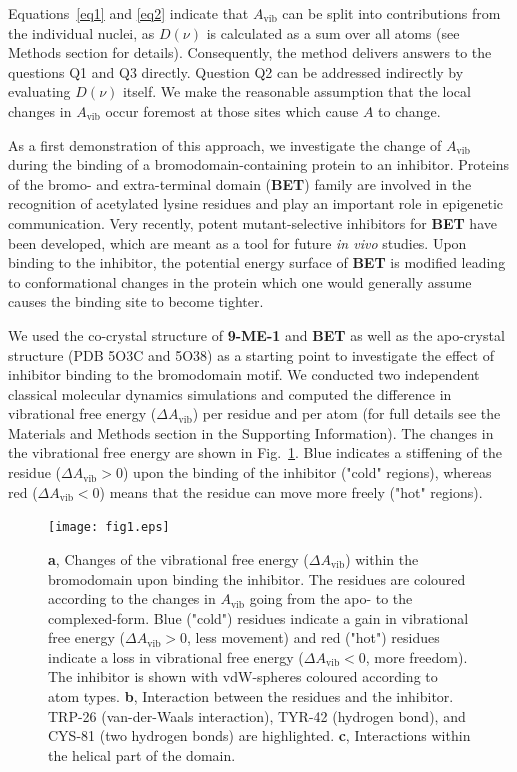\documentclass[journal=jpclcd,manuscript=article]{achemso}
\newcommand{\bet}{\textbf{BET}}
\newcommand{\avib}{A_\mathrm{vib}}
\begin{document}
Equations~\ref{eq1} and \ref{eq2} indicate that $\avib{}$ can be split into contributions from the individual nuclei, as $D(\nu)$ is calculated as a sum over all atoms (see Methods section for details). Consequently, the method delivers answers to the questions Q1 and Q3 directly. Question Q2 can be addressed indirectly by evaluating $D(\nu)$ itself. We make the reasonable assumption that the local changes in $\avib{}$ occur foremost at those sites which cause $A$ to change.

As a first demonstration of this approach, we investigate the change of $\avib{}$ during the binding of a bromodomain-containing protein to an inhibitor. Proteins of the bromo- and extra-terminal domain (\bet{}) family are involved in the recognition of acetylated lysine residues and play an important role in epigenetic communication\cite{Filippakopoulos2012}. Very recently, potent mutant-selective inhibitors for \bet{} have been developed\cite{Runcie2018}, which are meant as a tool for future \textit{in vivo} studies. Upon binding to the inhibitor, the potential energy surface of \bet{} is modified leading to conformational changes in the protein which one would generally assume causes the binding site to become tighter.

We used the co-crystal structure of \textbf{9-ME-1} and \bet{} as well as the apo-crystal structure (PDB 5O3C and 5O38\cite{Runcie2018}) as a starting point to investigate the effect of inhibitor binding to the bromodomain motif. We conducted two independent classical molecular dynamics simulations and computed the difference in vibrational free energy ($\Delta \avib{}$) per residue and per atom (for full details see the Materials and Methods section in the Supporting Information). The changes in the vibrational free energy are shown in Fig.~\ref{fig:bromo}. Blue indicates a stiffening of the residue ($\Delta \avib{} > 0$) upon the binding of the inhibitor ("cold" regions), whereas red ($\Delta \avib{} < 0$) means that the residue can move more freely ("hot" regions).

\begin{figure}[h!]
	\centering
	\texttt{[image: fig1.eps]}
	\caption{%
		\textbf{a}, Changes of the vibrational free energy ($\Delta \avib{}$) within the bromodomain upon binding the inhibitor. The residues are coloured according to the changes in $\avib{}$ going from the apo- to the complexed-form. Blue ("cold") residues indicate a gain in vibrational free energy ($\Delta \avib{} > 0$, less movement) and red ("hot") residues indicate a loss in vibrational free energy ($\Delta \avib{} < 0$, more freedom). The inhibitor is shown with vdW-spheres coloured according to atom types. 
		\textbf{b}, Interaction between the residues and the inhibitor. TRP-26 (van-der-Waals interaction), TYR-42 (hydrogen bond), and CYS-81 (two hydrogen bonds) are highlighted.  
		\textbf{c}, Interactions within the helical part of the domain. }
	\label{fig:bromo}
\end{figure}
\end{document}
